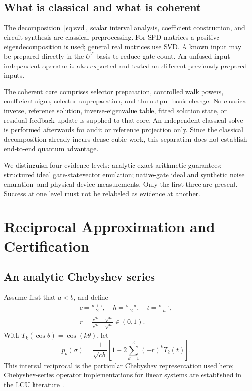 \documentclass[journal]{IEEEtran}
\begin{document}
\subsection{What is classical and what is coherent}
The decomposition~\eqref{eq:svd}, scalar interval analysis, coefficient
construction, and circuit synthesis are classical preprocessing. For SPD
matrices a positive eigendecomposition is used; general real matrices use
SVD. A known input may be prepared directly in the $U^T$ basis to reduce gate
count. An unfused input-independent operator is also exported and tested on
different previously prepared inputs.

The coherent core comprises selector preparation, controlled walk powers,
coefficient signs, selector unpreparation, and the output basis change.
No classical inverse, reference solution, inverse-eigenvalue table, fitted
solution state, or residual-feedback update is supplied to that core. An
independent classical solve is performed afterwards for audit or reference
projection only. Since the classical decomposition already incurs dense
cubic work, this separation does not establish end-to-end quantum advantage.

We distinguish four evidence levels: analytic exact-arithmetic guarantees;
structured ideal gate-statevector emulation; native-gate ideal and synthetic
noise emulation; and physical-device measurements. Only the first three are
present. Success at one level must not be relabeled as evidence at another.

\section{Reciprocal Approximation and Certification}
\label{sec:reciprocal}
\subsection{An analytic Chebyshev series}
Assume first that $a<b$, and define
\begin{equation}
 \begin{gathered}
 c=\frac{a+b}{2},\quad h=\frac{b-a}{2},\quad t=\frac{\sigma-c}{h},\\
 r=\frac{\sqrt b-\sqrt a}{\sqrt b+\sqrt a}\in(0,1).
 \end{gathered}
 \label{eq:parameters}
\end{equation}
With $T_k(\cos\theta)=\cos(k\theta)$, let
\begin{equation}
 p_d(\sigma)=\frac1{\sqrt{ab}}
 \left[1+2\sum_{k=1}^{d}(-r)^kT_k(t)\right].
 \label{eq:poly}
\end{equation}
This interval reciprocal is the particular Chebyshev representation used
here; Chebyshev-series operator implementations for linear systems are
established in the LCU literature \cite{childs2017}.
\end{document}
